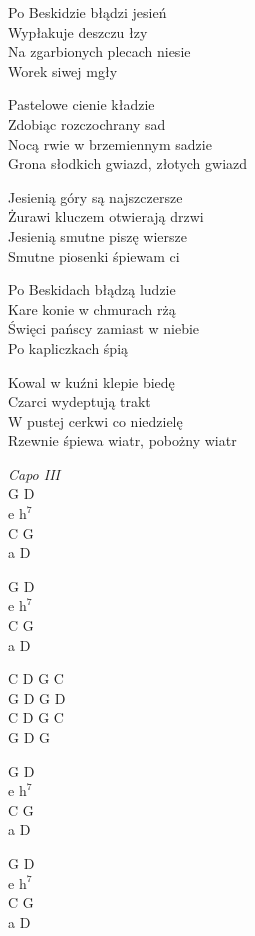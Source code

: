 \begin{text}
    \chordfill
    Po Beskidzie błądzi jesień \\
    Wypłakuje deszczu łzy\\
    Na zgarbionych plecach niesie\\
    Worek siwej mgły

    Pastelowe cienie kładzie\\
    Zdobiąc rozczochrany sad\\
    Nocą rwie w brzemiennym sadzie\\
    Grona słodkich gwiazd, złotych gwiazd

    \vin Jesienią góry są najszczersze\\
    \vin Żurawi kluczem otwierają drzwi\\
    \vin Jesienią smutne piszę wiersze\\
    \vin Smutne piosenki śpiewam ci

    Po Beskidach błądzą ludzie\\
    Kare konie w chmurach rżą\\
    Święci pańscy zamiast w niebie\\
    Po kapliczkach śpią

    Kowal w kuźni klepie biedę\\
    Czarci wydeptują trakt\\
    W pustej cerkwi co niedzielę\\
    Rzewnie śpiewa wiatr, pobożny wiatr
\end{text}
\begin{chord}
    \textit{Capo III}\\
    G D\\
    e $\mathrm{h^7}$\\
    C G\\
    a D

    G D\\
    e $\mathrm{h^7}$\\
    C G\\
    a D

    C D G C\\
    G D G D\\
    C D G C\\
    G D G

    G D\\
    e $\mathrm{h^7}$\\
    C G\\
    a D

    G D\\
    e $\mathrm{h^7}$\\
    C G\\
    a D
\end{chord}

